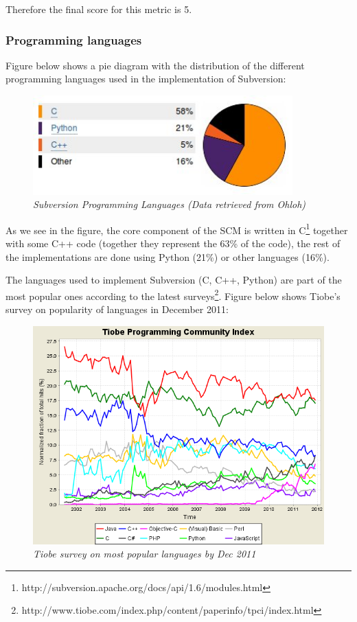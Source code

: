 \documentclass[a4paper,10pt]{article}
\begin{document}
Therefore the final score for this metric is 5.

\subsubsection{Programming languages}

Figure below shows a pie diagram with the distribution of the different programming languages used in the implementation of Subversion:

\begin{figure}[H]
    \centering
    \includegraphics[width=10cm, keepaspectratio]{img/SVNlanguages.jpg}
    \caption{\textit{Subversion Programming Languages (Data retrieved from Ohloh)}}
    \label{figure:svnlanguages}
 \end{figure}

As we see in the figure, the core component of the SCM is written in C\footnote{http://subversion.apache.org/docs/api/1.6/modules.html} together with some C++ code (together they represent the 63\% of the code), the rest of the implementations are done using Python (21\%) or other languages (16\%).

The languages used to implement Subversion (C, C++, Python) are part of the most popular ones according to the latest surveys\footnote{http://www.tiobe.com/index.php/content/paperinfo/tpci/index.html}. Figure below shows Tiobe's survey on popularity of languages in December 2011:

\begin{figure}[H]
    \centering
    \includegraphics[width=12cm, keepaspectratio]{img/tiobe.png}
    \caption{\textit{Tiobe survey on most popular languages by Dec 2011}}
    \label{figure:tiobe}
 \end{figure}
 
\end{document}
